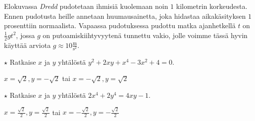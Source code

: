 \begin{tehtavasivu}
\begin{tehtava}
    Elokuvassa \emph{Dredd} pudotetaan ihmisiä kuolemaan noin $1$ kilometrin korkeudesta. Ennen pudotusta heille annetaan huumausainetta, joka hidastaa aikakäsityksen $1$ prosenttiin normaalista. Vapaassa pudotuksessa pudottu matka ajanhetkellä $t$ on $\frac{1}{2} gt^2$, jossa $g$ on putoamiskiihtyvyytenä tunnettu vakio, jolle voimme tässä hyvin käyttää arviota $g \approx 10\frac{\text{m}}{\text{s}^2}$.
    \begin{alakohdat}
    \end{alakohdat}
    \begin{vastaus}
        \begin{alakohdat}
        \end{alakohdat}
    \end{vastaus}
\end{tehtava}

\begin{tehtava}
    $\star$ Ratkaise $x$ ja $y$ yhtälöstä $y^2+2xy+x^4-3x^2+4=0$.
    \begin{vastaus}
        $x=\sqrt{2}, y=-\sqrt{2}$ tai $x=-\sqrt{2}, y=\sqrt{2}$
    \end{vastaus}
\end{tehtava}

\begin{tehtava} %
    $\star$ Ratkaise $x$ ja $y$ yhtälöstä $2x^4+2y^4=4xy-1$. %
    \begin{vastaus}
        $x=\frac{\sqrt{2}}{2}, y=\frac{\sqrt{2}}{2}$ tai $x=-\frac{\sqrt{2}}{2}, y=-\frac{\sqrt{2}}{2}$
    \end{vastaus}
\end{tehtava}

\end{tehtavasivu}